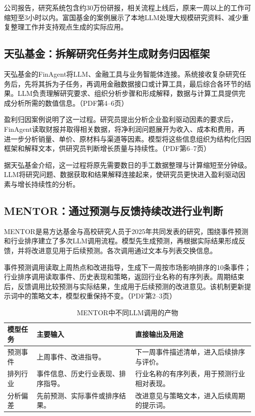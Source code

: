 \documentclass[11pt,a4paper,fontset=none]{ctexart}
\begin{document}
公司报告，研究系统包含约30万份研报，相关流程上线后，原来一周以上的工作可缩短至3小时以内。富国基金的案例展示了本地LLM处理大规模研究资料、减少重复整理工作并支持观点生成的实际应用。

\subsection{天弘基金：拆解研究任务并生成财务归因框架}
天弘基金的FinAgent将LLM、金融工具与业务智能体连接。系统接收复杂研究任务后，先将其拆为子任务，再调用金融数据接口或计算工具，最后综合各环节的结果。LLM负责理解研究要求、组织分析步骤和形成解释，数据与计算工具提供完成分析所需的数值信息。（PDF第4--6页）

盈利归因案例说明了这一过程。研究员提出分析企业盈利驱动因素的要求后，FinAgent读取财报并取得相关数据，将净利润问题展开为收入、成本和费用，再进一步分析销量、单价、原材料与渠道等因素。模型将这些信息组织为结构化归因框架和解释文本，供研究员判断增长质量与持续性。（PDF第6--7页）

据天弘基金介绍，这一过程将原先需要数日的手工数据整理与计算缩短至分钟级。LLM将研究问题、数据获取和结果解释连接起来，使研究员更快进入盈利驱动因素与增长持续性的分析。

\subsection{MENTOR：通过预测与反馈持续改进行业判断}
MENTOR是易方达基金与高校研究人员于2025年共同发表的研究，围绕事件预测和行业排序建立了多次LLM调用流程。模型先生成预测，再根据实际结果形成反馈，并将改进意见用于后续预测。各次调用通过文本与列表交换信息。

事件预测调用读取上周热点和改进指导，生成下一周按市场影响排序的10条事件；行业排序调用读取事件、历史表现和策略，返回行业名称的有序列表。周期结束后，反馈调用比较预测与实际结果，生成用于后续预测的改进意见。该机制更新提示词中的策略文本，模型权重保持不变。（PDF第2--3页）

\begin{table}[H]\small\centering
\caption{MENTOR中不同LLM调用的产物}
\begin{tabularx}{\linewidth}{@{}P{28mm}Y Y@{}}\toprule
模型任务 & 主要输入 & 直接输出及用途\\\midrule
预测事件 & 上周事件、改进指导。 & 下一周事件描述清单，进入后续排序与评价。\\
排列行业 & 事件信息、历史行业表现、排序指导。 & 行业名称的有序列表，用于预测行业相对表现。\\
分析偏差 & 先前预测、实际事件或排序结果。 & 改进意见与策略文本，进入后续周期的提示词。\\\bottomrule
\end{tabularx}
\end{table}
\end{document}
